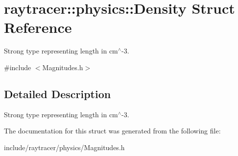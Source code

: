 \hypertarget{structraytracer_1_1physics_1_1Density}{}\section{raytracer\+:\+:physics\+:\+:Density Struct Reference}
\label{structraytracer_1_1physics_1_1Density}


Strong type representing length in cm$^\wedge$-\/3.  




{\ttfamily \#include $<$Magnitudes.\+h$>$}



\subsection{Detailed Description}
Strong type representing length in cm$^\wedge$-\/3. 



The documentation for this struct was generated from the following file\+:\begin{DoxyCompactItemize}
\item 
include/raytracer/physics/Magnitudes.\+h\end{DoxyCompactItemize}

